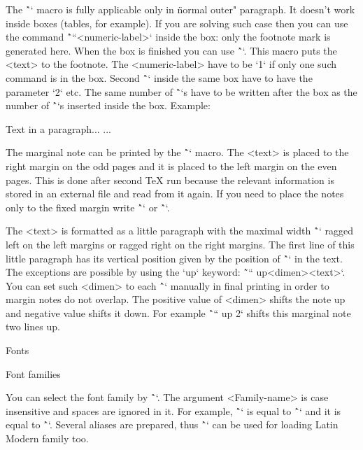 The \^`\fnote` macro is fully applicable only in \"normal outer" paragraph.
It doesn't work inside boxes (tables, for example). If you are solving such
case then you can use the command \^`\fnotemark``<numeric-label>` inside the box: only the 
footnote mark is generated here. When the box is finished you can use 
\^``. This macro puts the <text> to the footnote. 
The <numeric-label> have to be `1` if only one such command is in the box. 
Second \^`\fnotemark` inside the same box have to have the parameter `2` etc. 
The same number of \^`\fnotetext`s have to be written 
after the box as the number of \^`\fnotemark`s inserted inside the box.
Example:

\begtt
Text in a paragraph...    %
...
\endtt

The marginal note can be printed by the \^`` macro. The <text>
is placed to the right margin on the odd pages and it is placed to the left
margin on the even pages. This is done after second \TeX{} run because the
relevant information is stored in an external file and read from it again. 
If you need to place the notes only to the fixed margin write 
\^`\fixmnotes\right` or \^`\fixmnotes\left`.

The <text> is formatted as a little paragraph with the maximal width
\^`\mnotesize` ragged left on the left margins or ragged right on the right
margins. The first line of this little paragraph has its vertical position
given by the position of \^`\mnote` in the text. The exceptions are possible
by using the `up` keyword: \~`\mnote`` up<dimen>{<text>}`.
You can set such <dimen> to each \^`\mnote` manually in final printing
in order to margin notes do not overlap. The positive value of <dimen>
shifts the note up and negative value shifts it down. For example
\^`\mnote`` up 2` shifts this marginal note two lines up.


\sec Fonts

\secc[fontfam] Font families

You can select the font family by \^``.
The argument <Family-name> is case insensitive and spaces are ignored in it. For
example, \^`\fontfam[LM Fonts]` is equal to \^`\fontfam[LMfonts]` and it is equal
to \^`\fontfam[lmfonts]`. Several aliases are prepared, thus 
\^`` can be used for loading Latin Modern family too.

